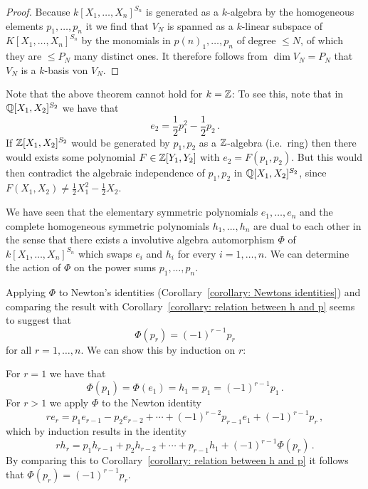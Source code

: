 \begin{proof}
  Because $k[X_1, \dotsc, X_n]^{S_n}$ is generated as a $k$-algebra by the homogeneous elements $p_1, \dotsc, p_n$ it we find that $V_N$ is spanned as a $k$-linear subspace of $K[X_1, \dotsc, X_n]^{S_n}$ by the monomials in $p{(n)}_1, \dotsc, p_n$ of degree $\leq N$, of which they are $\leq P_N$ many distinct ones.
  It therefore follows from $\dim V_N = P_N$ that $V_N$ is a $k$-basis von $V_N$.
\end{proof}


\begin{remark}
  Note that the above theorem cannot hold for $k = \mathbb{Z}$:
  To see this, note that in $\mathbb{Q}[X_1, X_2]^{S_2}$ we have that
  \[
      e_2
    = \frac{1}{2}  p_1^2 - \frac{1}{2} p_2 \,.
  \]
  If $\mathbb{Z}[X_1, X_2]^{S_2}$ would be generated by $p_1, p_2$ as a $\mathbb{Z}$-algebra (i.e.\ ring) then there would exists some polynomial $F \in \mathbb{Z}[Y_1, Y_2]$ with $e_2 = F( p_1, p_2)$.
  But this would then contradict the algebraic independence of $p_1, p_2$ in $\mathbb{Q}[X_1, X_2]^{S_2}$, since $F(X_1, X_2) \neq \frac{1}{2} X_1^2 - \frac{1}{2} X_2$.
\end{remark}


% 


\begin{fluff}
  We have seen that the elementary symmetric polynomials $e_1, \dotsc, e_n$ and the complete homogeneous symmetric polynomials $h_1, \dotsc, h_n$ are dual to each other in the sense that there exists a involutive algebra automorphism $\Phi$ of $k[X_1, \dotsc, X_n]^{S_n}$ which swaps $e_i$ and $h_i$ for every $i = 1, \dotsc, n$.
  We can determine the action of $\Phi$ on the power sums $p_1, \dotsc, p_n$.
  
  Applying $\Phi$ to Newton’s identities (Corollary~\ref{corollary: Newtons identities}) and comparing the result with Corollary~\ref{corollary: relation between h and p} seems to suggest that
  \[
      \Phi(p_r)
    = (-1)^{r-1} p_r
  \]
  for all $r = 1, \dotsc, n$.
  We can show this by induction on $r$:
  
  For $r = 1$ we have that
  \[
      \Phi(p_1)
    = \Phi(e_1)
    = h_1
    = p_1
    = (-1)^{r-1} p_1  \,.
  \]
  For $r > 1$ we apply $\Phi$ to the Newton identity
  \[
      r e_r
    =   p_1 e_{r-1}
      - p_2 e_{r-2}
      + \dotsb
      + (-1)^{r-2}  p_{r-1} e_1
      + (-1)^{r-1}  p_r \,,
  \]
  which by induction results in the identity
  \[
      r h_r
    =   p_1 h_{r-1}
      + p_2 h_{r-2}
      + \dotsb
      + p_{r-1} h_1
      + (-1)^{r-1} \Phi(p_r) \,.
  \]
  By comparing this to Corollary~\ref{corollary: relation between h and p} it follows that $\Phi( p_r ) = (-1)^{r-1} p_r$.
\end{fluff}





